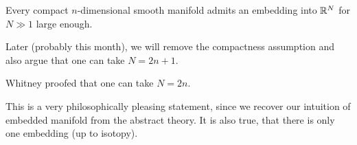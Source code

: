 \begin{theorem}[Whitney]\label{thm:5.6:whithney}
    Every compact \(n\)-dimensional smooth manifold admits an embedding into \(\mathbb{R}^N\) for 
    \(N\gg 1\) large enough.
\end{theorem}

\begin{remark}
    Later (probably this month), we will remove the compactness assumption and also argue that one 
    can take \(N=2n+1\).

    Whitney proofed that one can take \(N=2n\).
\end{remark}

\begin{aremark}
This is a very philosophically pleasing statement, since we recover our intuition of embedded manifold from the abstract theory. It is also true, that there is only one embedding (up to isotopy). 
\end{aremark}

